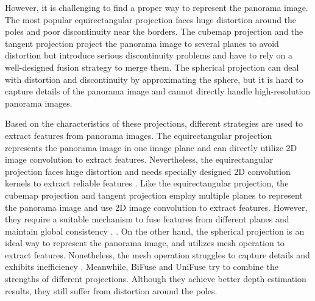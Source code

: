 However, it is challenging to find a proper way to represent the panorama image. 
The most popular equirectangular projection faces huge distortion around the poles and poor discontinuity near the borders. The cubemap projection \cite{skupin2017standardization} and the tangent projection \cite{eder2020tangent,shen2022panoformer,li2022omnifusion} project the panorama image to several planes to avoid distortion but introduce serious discontinuity problems and have to rely on a well-designed fusion strategy to merge them. The spherical projection \cite{yan2022spheredepth} can deal with distortion and discontinuity by approximating the sphere, but it is hard to capture details of the panorama image and cannot directly handle high-resolution panorama images.


Based on the characteristics of these projections, different strategies are used to extract features from panorama images. 
The equirectangular projection represents the panorama image in one image plane and can directly utilize 2D image convolution to extract features. Nevertheless, the equirectangular projection faces huge distortion and needs specially designed 2D convolution kernels to extract reliable features \cite{zioulis2018omnidepth,tateno2018distortion,chen2021distortion}.
Like the equirectangular projection, the cubemap projection and tangent projection employ multiple planes to represent the panorama image and use 2D image convolution to extract features. However, they require a suitable mechanism to fuse features from different planes and maintain global consistency \cite{cheng2018cube,li2022omnifusion,shen2022panoformer,peng2022high}. 
\cite{yan2022spheredepth,hu2021subdivision,feng2019meshnet,hanocka2019meshcnn}.
On the other hand, the spherical projection is an ideal way to represent the panorama image, and utilizes mesh operation to extract features. Nonetheless, the mesh operation struggles to capture details and exhibits inefficiency \cite{yan2022spheredepth,hu2021subdivision,feng2019meshnet,hanocka2019meshcnn}.
Meanwhile, BiFuse \cite{wang2020bifuse} and UniFuse \cite{jiang2021unifuse} try to combine the strengths of different projections. Although they achieve better depth estimation results, they still suffer from distortion around the poles.


